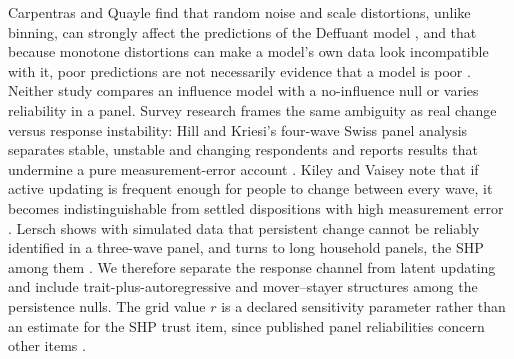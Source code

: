 Carpentras and Quayle find that random noise and scale distortions, unlike binning, can strongly affect the predictions of the Deffuant model \cite{carpentras2022}, and that because monotone distortions can make a model's own data look incompatible with it, poor predictions are not necessarily evidence that a model is poor \cite{carpentras2023}.
Neither study compares an influence model with a no-influence null or varies reliability in a panel.
Survey research frames the same ambiguity as real change versus response instability: Hill and Kriesi's four-wave Swiss panel analysis separates stable, unstable and changing respondents and reports results that undermine a pure measurement-error account \cite{hill2001,hillkriesi2001}.
Kiley and Vaisey note that if active updating is frequent enough for people to change between every wave, it becomes indistinguishable from settled dispositions with high measurement error \cite{kiley2020}.
Lersch shows with simulated data that persistent change cannot be reliably identified in a three-wave panel, and turns to long household panels, the SHP among them \cite{lersch2023}.
We therefore separate the response channel from latent updating and include trait-plus-autoregressive and mover--stayer structures among the persistence nulls.
The grid value $r$ is a declared sensitivity parameter rather than an estimate for the SHP trust item, since published panel reliabilities concern other items \cite{antoun2026,lucasdonnellan2012}.

